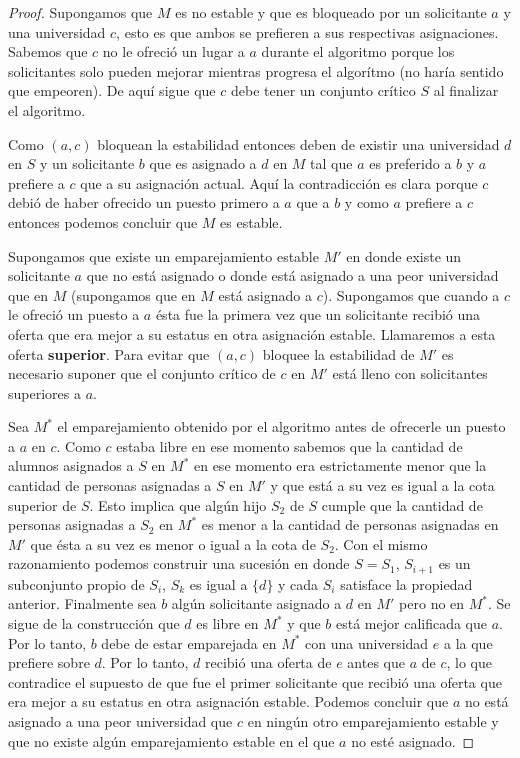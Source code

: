 \begin{proof}
Supongamos que $M$ es no estable y que es bloqueado por un solicitante $a$ y una universidad $c$, esto es que ambos se prefieren a sus respectivas asignaciones. Sabemos que $c$ no le ofreció un lugar a $a$ durante el algoritmo porque los solicitantes solo pueden mejorar mientras progresa el algorítmo (no haría sentido que empeoren). De aquí sigue que $c$ debe tener un conjunto crítico $S$ al finalizar el algoritmo.

Como $(a,c)$ bloquean la estabilidad entonces deben de existir una universidad $d$ en $S$ y un solicitante $b$ que es asignado a $d$ en $M$ tal que $a$ es preferido a $b$ y $a$ prefiere a $c$ que a su asignación actual. Aquí la contradicción es clara porque $c$ debió de haber ofrecido un puesto primero a $a$ que a $b$ y como $a$ prefiere a $c$ entonces podemos concluir que $M$ es estable. 

Supongamos que existe un emparejamiento estable $M'$ en donde existe un solicitante $a$ que no está asignado o donde está asignado a una peor universidad que en $M$ (supongamos que en $M$ está asignado a $c$). Supongamos que cuando a $c$ le ofreció un puesto a $a$ ésta fue la primera vez que un solicitante recibió una oferta que era mejor a su estatus en otra asignación estable. Llamaremos a esta oferta \textbf{superior}. Para evitar que $(a,c)$ bloquee la estabilidad de $M'$ es necesario suponer que el conjunto crítico de $c$ en $M'$ está lleno con solicitantes superiores a $a$. 

Sea $M^*$ el emparejamiento obtenido por el algoritmo antes de ofrecerle un puesto a $a$ en $c$. Como $c$ estaba libre en ese momento sabemos que la cantidad de alumnos asignados a $S$ en $M^*$ en ese momento era estrictamente menor que la cantidad de personas asignadas a $S$ en $M'$ y que está a su vez es igual a la cota superior de $S$. Esto implica que algún hijo $S_2$ de $S$ cumple que la cantidad de personas asignadas a $S_2$ en $M^*$ es menor a la cantidad de personas asignadas en $M'$ que ésta a su vez es menor o igual a la cota de $S_2$. Con el mismo razonamiento podemos construir una sucesión en donde $S=S_1$, $S_{i+1}$ es un subconjunto propio de $S_i$, $S_{k}$ es igual a $\{d\}$ y cada $S_i$ satisface la propiedad anterior. Finalmente sea $b$ algún solicitante asignado a $d$ en $M'$ pero no en $M^*$. Se sigue de la construcción que $d$ es libre en $M^*$ y que $b$ está mejor calificada que $a$. Por lo tanto, $b$ debe de estar emparejada en $M^*$ con una universidad $e$ a la que prefiere sobre $d$. Por lo tanto, $d$ recibió una oferta de $e$ antes que $a$ de $c$, lo que contradice el supuesto de que fue el primer solicitante que recibió una oferta que era mejor a su estatus en otra asignación estable. Podemos concluir que $a$ no está asignado a una peor universidad que $c$ en ningún otro emparejamiento estable y que no existe algún emparejamiento estable en el que $a$ no esté asignado. 


\end{proof}
